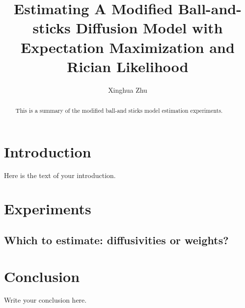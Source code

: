 \documentclass{article}
\begin{document}
\title{Estimating A Modified Ball-and-sticks Diffusion Model with Expectation Maximization and Rician Likelihood}
\author{Xinghua Zhu}

\maketitle

\begin{abstract}
This is a summary of the modified ball-and sticks model estimation experiments.
\end{abstract}

\section{Introduction}
Here is the text of your introduction.

\section{Experiments}

\subsection{Which to estimate: diffusivities or weights?}



\section{Conclusion}
Write your conclusion here.
\end{document}
